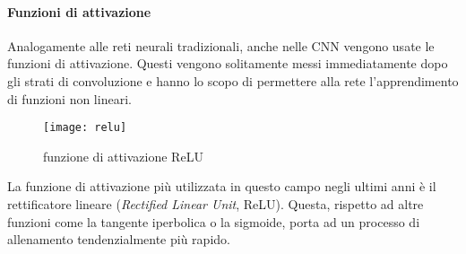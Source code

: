\paragraph{Funzioni di attivazione}
Analogamente alle reti neurali tradizionali, anche nelle CNN vengono usate le funzioni di attivazione. Questi vengono solitamente messi immediatamente dopo gli strati di convoluzione e hanno lo scopo di permettere alla rete l'apprendimento di funzioni non lineari. 
\begin{figure}[ht]
    \centering
    \texttt{[image: relu]}
    \caption[Funzione di attivazione relu]{funzione di attivazione ReLU}
\end{figure}
La funzione di attivazione più utilizzata in questo campo negli ultimi anni è il rettificatore lineare (\textit{Rectified Linear Unit}, ReLU). Questa, rispetto ad altre funzioni come la tangente iperbolica o la sigmoide, porta ad un processo di allenamento tendenzialmente più rapido.